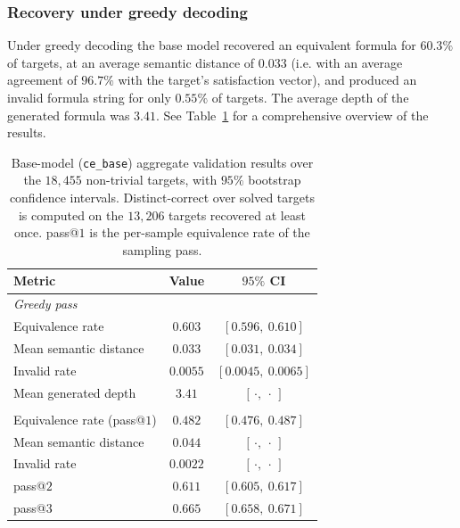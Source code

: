 \documentclass[titlepage,a4paper,11pt]{report}
\begin{document}
    \subsubsection{Recovery under greedy decoding}
    Under greedy decoding the base model recovered an equivalent formula for $60.3\%$ of targets, at an average semantic distance of $0.033$ (i.e. with an average agreement of $96.7\%$ with the target's satisfaction vector), and produced an invalid formula string for only $0.55\%$ of targets. The average depth of the generated formula was $3.41$. See Table~\ref{tab:exp1_results_overall} for a comprehensive overview of the results.
    
    \begin{table}[ht]
        \centering
        \caption{Base-model (\texttt{ce\_base}) aggregate validation results over the $18{,}455$ non-trivial targets, with $95\%$ bootstrap confidence intervals. Distinct-correct over solved targets is computed on the $13{,}206$ targets recovered at least once. \textup{pass}@$1$ is the per-sample equivalence rate of the sampling pass.}
        \label{tab:exp1_results_overall}
        \begin{tabular}{lcc}
            \toprule
            Metric & Value & $95\%$ CI \\
            \midrule
            \multicolumn{3}{l}{\emph{Greedy pass}} \\
            \quad Equivalence rate & $0.603$ & $[0.596,\ 0.610]$ \\
            \quad Mean semantic distance    & $0.033$ & $[0.031,\ 0.034]$ \\
            \quad Invalid rate              & $0.0055$ & $[0.0045,\ 0.0065]$ \\
            \quad Mean generated depth      & $3.41$ & $[\,\cdot,\ \cdot\,]$ \\
            \addlinespace
            \multicolumn{3}{l}{\emph{Sampling pass}} \\
            \quad Equivalence rate (pass@$1$) & $0.482$ & $[0.476,\ 0.487]$ \\
            \quad Mean semantic distance    & $0.044$ & $[\,\cdot,\ \cdot\,]$ \\
            \quad Invalid rate              & $0.0022$ & $[\,\cdot,\ \cdot\,]$ \\
            \quad pass@$2$                  & $0.611$ & $[0.605,\ 0.617]$ \\
            \quad pass@$3$                  & $0.665$ & $[0.658,\ 0.671]$ \\

\end{tabular}
\end{table}
\end{document}
